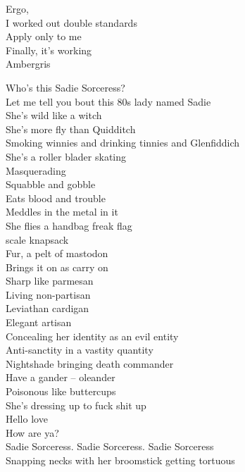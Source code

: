 Ergo, \\
I worked out double standards \\
Apply only to me \\
Finally, it's working \\
Ambergris \\




Who's this Sadie Sorceress? \\

Let me tell you bout this 80s lady named Sadie \\
She's wild like a witch \\
She's more fly than Quidditch \\
Smoking winnies and drinking tinnies and Glenfiddich \\
She's a roller blader skating \\
Masquerading \\
Squabble and gobble \\
Eats blood and trouble \\
Meddles in the metal in it \\
She flies a handbag freak flag \\
 scale knapsack \\
Fur, a pelt of mastodon \\
Brings it on as carry on \\
Sharp like parmesan \\
Living non-partisan \\
Leviathan cardigan \\
Elegant artisan \\
Concealing her identity as an evil entity \\
Anti-sanctity in a vastity quantity \\
Nightshade bringing death commander \\
Have a gander -- oleander \\
Poisonous like buttercups \\
She's dressing up to fuck shit up \\

Hello love \\
How are ya? \\

Sadie Sorceress. Sadie Sorceress. Sadie Sorceress \\
Snapping necks with her broomstick getting tortuous \\

